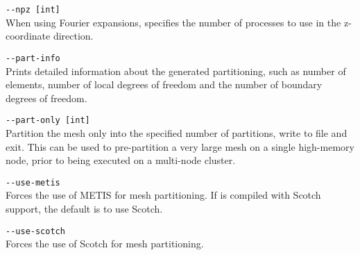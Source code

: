 \lstinline[style=BashInputStyle]{--npz [int]}\\
\hangindent=1.5cm
When using Fourier expansions, specifies the number of processes to use in the z-coordinate direction.

\lstinline[style=BashInputStyle]{--part-info}\\
\hangindent=1.5cm
Prints detailed information about the generated partitioning, such as number of
elements, number of local degrees of freedom and the number of boundary degrees
of freedom.

\lstinline[style=BashInputStyle]{--part-only [int]}\\
\hangindent=1.5cm
Partition the mesh only into the specified number of partitions, write to file
and exit. This can be used to pre-partition a very large mesh on a single
high-memory node, prior to being executed on a multi-node cluster.

\lstinline[style=BashInputStyle]{--use-metis}\\
\hangindent=1.5cm
Forces the use of METIS for mesh partitioning. If \nekpp{} is compiled with
Scotch support, the default is to use Scotch.

\lstinline[style=BashInputStyle]{--use-scotch}\\
\hangindent=1.5cm
Forces the use of Scotch for mesh partitioning.
